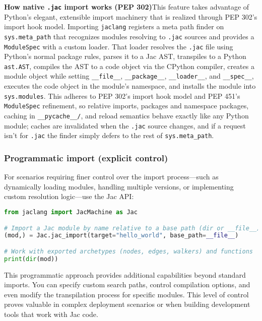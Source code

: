 \begin{nerd}
\textbf{How native \texttt{.jac} import works (PEP 302)}\quad This feature takes advantage of Python's elegant, extensible import machinery that is realized through PEP 302's import hook model. Importing \texttt{jaclang} registers a meta path finder on \texttt{sys.meta\_path} that recognizes modules resolving to \texttt{.jac} sources and provides a \texttt{ModuleSpec} with a custom loader. That loader resolves the \texttt{.jac} file using Python's normal package rules, parses it to a Jac AST, transpiles to a Python \texttt{ast.AST}, compiles the AST to a code object via the CPython compiler, creates a module object while setting \texttt{\_\_file\_\_}, \texttt{\_\_package\_\_}, \texttt{\_\_loader\_\_}, and \texttt{\_\_spec\_\_}, executes the code object in the module's namespace, and installs the module into \texttt{sys.modules}. This adheres to PEP 302's import hook model and PEP 451's \texttt{ModuleSpec} refinement, so relative imports, packages and namespace packages, caching in \texttt{\_\_pycache\_\_/}, and reload semantics behave exactly like any Python module; caches are invalidated when the \texttt{.jac} source changes, and if a request isn't for \texttt{.jac} the finder simply defers to the rest of \texttt{sys.meta\_path}.
\end{nerd}

\subsubsection{Programmatic import (explicit control)}

For scenarios requiring finer control over the import process—such as dynamically loading modules, handling multiple versions, or implementing custom resolution logic—use the Jac API:

\begin{lstlisting}[language=Python]
from jaclang import JacMachine as Jac

# Import a Jac module by name relative to a base path (dir or __file__)
(mod,) = Jac.jac_import(target="hello_world", base_path=__file__)

# Work with exported archetypes (nodes, edges, walkers) and functions
print(dir(mod))
\end{lstlisting}

This programmatic approach provides additional capabilities beyond standard imports. You can specify custom search paths, control compilation options, and even modify the transpilation process for specific modules. This level of control proves valuable in complex deployment scenarios or when building development tools that work with Jac code.

